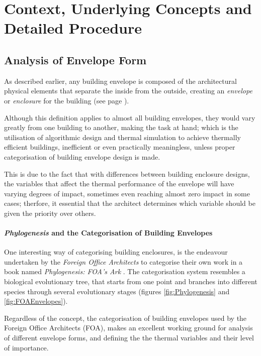 \section{Context, Underlying Concepts and Detailed Procedure}
\label{sec:DetailedProcedure}

\subsection{Analysis of Envelope Form}
\label{sec:AnalyseEnvelope}

As described earlier, any building envelope is composed of the architectural physical elements that separate the inside from the outside, creating an \emph{envelope} or \emph{enclosure} for the building (see page \pageref{BuildEnvDef}).

Although this definition applies to almost all building envelopes, they would vary greatly from one building to another, making the task at hand; which is the utilisation of algorithmic design and thermal simulation to achieve thermally efficient buildings, inefficient or even practically meaningless, unless proper categorisation of building envelope design is made.

This is due to the fact that with differences between building enclosure designs, the variables that affect the thermal performance of the envelope will have varying degrees of impact, sometimes even reaching almost zero impact in some cases; therfore, it essential that the architect determines which variable should be given the priority over others.

\paragraph{\emph{Phylogenesis} and the Categorisation of Building Envelopes}\mbox{}

One interesting way of categorising building enclosures, is the endeavour undertaken by the \emph{Foreign Office Architects} to categorise their own work in a book named \emph{Phylogenesis: FOA's Ark} \cite{foa04}. The categorisation system resembles a biological evolutionary tree, that starts from one point and branches into different species through several evolutionary stages (figures \ref{fig:Phylogenesis} and \ref{fig:FOAEnvelopes}).

Regardless of the concept, the categorisation of building envelopes used by the Foreign Office Architects (FOA), makes an excellent working ground for analysis of different envelope forms, and defining the the thermal variables and their level of importance.


